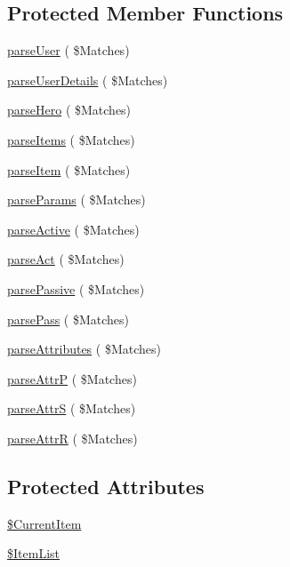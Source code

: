 \subsection*{Protected Member Functions}
\begin{DoxyCompactItemize}
\item 
\hyperlink{class_hn_s_hero_parser_a9cf003b816c6cec46334bce6acb2ee34}{parse\+User} ( \$Matches)
\item 
\hyperlink{class_hn_s_hero_parser_a01475115beae31cb18668710cca48144}{parse\+User\+Details} ( \$Matches)
\item 
\hyperlink{class_hn_s_hero_parser_af577e30965cb36431463df160e913ff8}{parse\+Hero} ( \$Matches)
\item 
\hyperlink{class_hn_s_hero_parser_ade299a51769e68b2aee30b479942b447}{parse\+Items} ( \$Matches)
\item 
\hyperlink{class_hn_s_hero_parser_aebda147e79e7e7659ba7976455db095c}{parse\+Item} ( \$Matches)
\item 
\hyperlink{class_hn_s_hero_parser_adcd89614ad1fa41941418ae8ea5f0b1a}{parse\+Params} ( \$Matches)
\item 
\hyperlink{class_hn_s_hero_parser_a2c7f954291280bae51ad06f81145ff32}{parse\+Active} ( \$Matches)
\item 
\hyperlink{class_hn_s_hero_parser_ae5aebf1b85099d63768d7e0bbe3023d0}{parse\+Act} ( \$Matches)
\item 
\hyperlink{class_hn_s_hero_parser_adef3a079ee7bfd550c80bac1a6148eb0}{parse\+Passive} ( \$Matches)
\item 
\hyperlink{class_hn_s_hero_parser_acef885d138ef4a0ad902150d968b60ef}{parse\+Pass} ( \$Matches)
\item 
\hyperlink{class_hn_s_hero_parser_a68bdb1bde555e9a9b70a37716838a681}{parse\+Attributes} ( \$Matches)
\item 
\hyperlink{class_hn_s_hero_parser_a9e86a51dd6f1b0d2f60a92a840e3deb4}{parse\+AttrP} ( \$Matches)
\item 
\hyperlink{class_hn_s_hero_parser_a322f6767efcd5b7b71ce8e9792f9e469}{parse\+AttrS} ( \$Matches)
\item 
\hyperlink{class_hn_s_hero_parser_adcc83933771af3b55b0fa5c6d08e3dba}{parse\+AttrR} ( \$Matches)
\end{DoxyCompactItemize}
\subsection*{Protected Attributes}
\begin{DoxyCompactItemize}
\item 
\hyperlink{class_hn_s_hero_parser_a9791a1b55e2668bdb5df8d6f0703cf57}{\$\+Current\+Item}
\item 
\hyperlink{class_hn_s_hero_parser_aac2a72273a9c28c805a46cdc40a5ab44}{\$\+Item\+List}
\end{DoxyCompactItemize}
